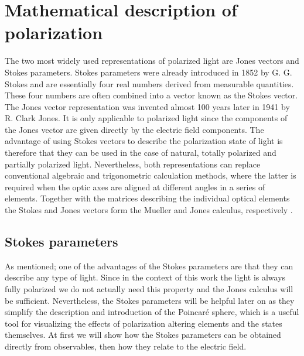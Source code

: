 
\section{Mathematical description of polarization}
\label{sec:math_desc}
The two most widely used representations of polarized light are Jones vectors and Stokes parameters. Stokes parameters were already introduced in 1852 by G. G. Stokes and are essentially four real numbers derived from measurable quantities. These four numbers are often combined into a vector known as the Stokes vector. The Jones vector representation was invented almost 100 years later in 1941 by R. Clark Jones. It is only applicable to polarized light since the components of the Jones vector are given directly by the electric field components. The advantage of using Stokes vectors to describe the polarization state of light is therefore that they can be used in the case of natural, totally polarized and partially polarized light. Nevertheless, both representations can replace conventional algebraic and trigonometric calculation methods, where the latter is required when the optic axes are aligned at different angles in a series of elements. Together with the matrices describing the individual optical elements the Stokes and Jones vectors form the Mueller and Jones calculus, respectively \cite{Shurcliff1962}. 

\subsection{Stokes parameters}
\label{sec:stokes_parameters}
As mentioned; one of the advantages of the Stokes parameters are that they can describe any type of light. Since in the context of this work the light is always fully polarized we do not actually need this property and the Jones calculus will be sufficient. Nevertheless, the Stokes parameters will be helpful later on as they simplify the description and introduction of the Poincaré sphere, which is a useful tool for visualizing the effects of polarization altering elements and the states themselves. At first we will show how the Stokes parameters can be obtained directly from observables, then how they relate to the electric field.

